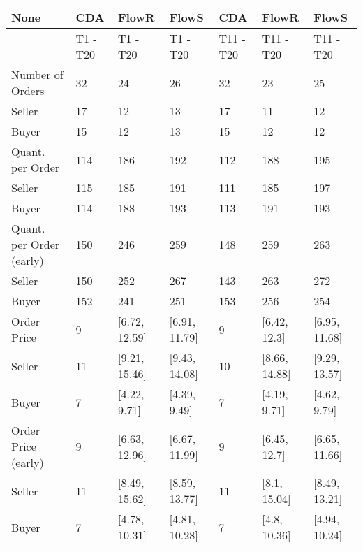 \begin{tabular}{lllllll}
\hline
 None                     & CDA      & FlowR         & FlowS         & CDA       & FlowR         & FlowS         \\
\hline
                          & T1 - T20 & T1 - T20      & T1 - T20      & T11 - T20 & T11 - T20     & T11 - T20     \\
 Number of Orders         & 32       & 24            & 26            & 32        & 23            & 25            \\
 Seller                   & 17       & 12            & 13            & 17        & 11            & 12            \\
 Buyer                    & 15       & 12            & 13            & 15        & 12            & 12            \\
 Quant. per Order         & 114      & 186           & 192           & 112       & 188           & 195           \\
 Seller                   & 115      & 185           & 191           & 111       & 185           & 197           \\
 Buyer                    & 114      & 188           & 193           & 113       & 191           & 193           \\
 Quant. per Order (early) & 150      & 246           & 259           & 148       & 259           & 263           \\
 Seller                   & 150      & 252           & 267           & 143       & 263           & 272           \\
 Buyer                    & 152      & 241           & 251           & 153       & 256           & 254           \\
 Order Price              & 9        & [6.72, 12.59] & [6.91, 11.79] & 9         & [6.42, 12.3]  & [6.95, 11.68] \\
 Seller                   & 11       & [9.21, 15.46] & [9.43, 14.08] & 10        & [8.66, 14.88] & [9.29, 13.57] \\
 Buyer                    & 7        & [4.22, 9.71]  & [4.39, 9.49]  & 7         & [4.19, 9.71]  & [4.62, 9.79]  \\
 Order Price (early)      & 9        & [6.63, 12.96] & [6.67, 11.99] & 9         & [6.45, 12.7]  & [6.65, 11.66] \\
 Seller                   & 11       & [8.49, 15.62] & [8.59, 13.77] & 11        & [8.1, 15.04]  & [8.49, 13.21] \\
 Buyer                    & 7        & [4.78, 10.31] & [4.81, 10.28] & 7         & [4.8, 10.36]  & [4.94, 10.24] \\

\end{tabular}
